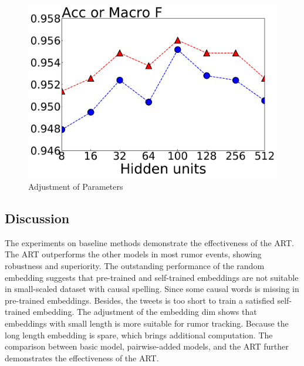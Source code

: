 \begin{figure}[htbp]
{\begin{minipage}[b]{0.35\linewidth}
			\includegraphics[width=1\linewidth]{fig/hidden_units}
		\end{minipage}
	}
	\caption{Adjustment of Parameters}
	\label{fig:parameter}
\end{figure}


\subsection{Discussion}
The experiments on baseline methods demonstrate the effectiveness of the ART. The ART outperforms the other models in most rumor events, showing robustness and superiority. The outstanding performance of the random embedding suggests that pre-trained and self-trained embeddings are not suitable in small-scaled dataset with causal spelling. Since some causal words is missing in pre-trained embeddings. Besides, the tweets is too short to train a satisfied self-trained embedding. The adjustment of the embedding dim shows that embeddings with small length is more suitable for rumor tracking. Because the long length embedding is spare, which brings additional computation. The comparison between basic model, pairwise-added models, and the ART further demonstrates the effectiveness of the ART. 


